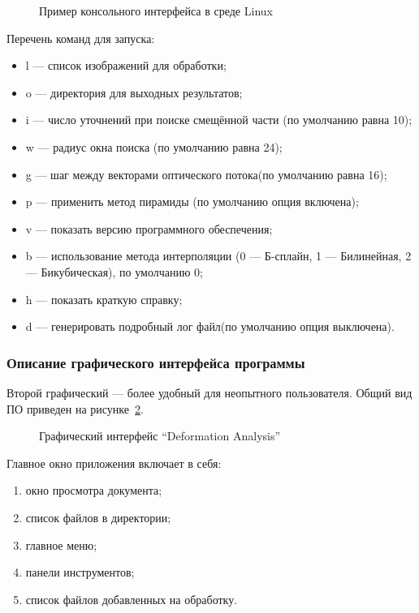 \begin{figure}[h!]
\caption{Пример консольного интерфейса в среде Linux}
\label{pic:con_scr}
\end{figure}

Перечень команд для запуска:
\begin{itemize}
\item l — список изображений для обработки;
\item o — директория для выходных результатов;
\item i — число уточнений при поиске смещённой части (по умолчанию равна 10);
\item w — радиус окна поиска (по умолчанию равна 24);
\item g — шаг между векторами оптического потока(по умолчанию равна 16);
\item p — применить метод пирамиды (по умолчанию опция включена);
\item v — показать версию программного обеспечения;
\item b — использование метода интерполяции (0 — Б-сплайн, 1 — Билинейная, 2 — Бикубическая), по умолчанию 0;
\item h — показать краткую справку;
\item d — генерировать подробный лог файл(по умолчанию опция выключена).
\end{itemize}
\subsubsection{Описание графического интерфейса программы}
Второй графический — более удобный для неопытного пользователя. Общий вид ПО приведен на рисунке \ref{pic:gui_scr}. 
\begin{figure}[h!]
\caption{Графический интерфейс ``Deformation Analysis''}
\label{pic:gui_scr}
\end{figure}
Главное окно приложения включает в себя:
\begin{enumerate}
\item окно просмотра документа;
\item список файлов в директории;
\item главное меню;
\item панели инструментов;
\item список файлов добавленных на обработку.
\end{enumerate}


